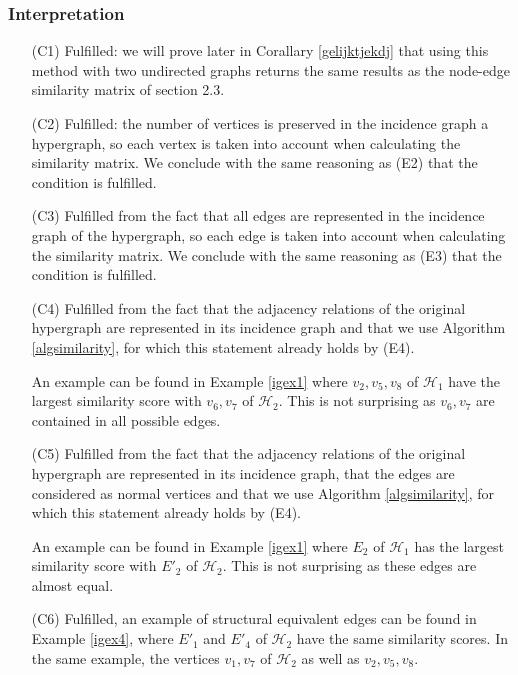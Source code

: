 \documentclass[a4paper,11pt]{report}
\newcommand{\hgrafeen}{\mathcal{H}}
\begin{document}
\subsubsection{Interpretation}

\begin{itemize}
  \item[(C1)] Fulfilled: we will prove later in Corallary \ref{gelijktjekdj} 
  that using this method with two undirected graphs returns the same results as 
  the node-edge similarity matrix of section 2.3.
      \item[(C2)] Fulfilled: the number of vertices is preserved in the incidence graph a hypergraph, so each vertex is taken into account when calculating the similarity matrix. We conclude with the same reasoning as (E2) that the condition is fulfilled.
    \item[(C3)] Fulfilled from the fact that all edges are 
    represented in the incidence graph of the hypergraph, so each edge is taken into account when calculating the similarity matrix. We conclude with the same reasoning as (E3) that the condition is fulfilled.

  \item[(C4)] Fulfilled from the fact that the adjacency relations of the original hypergraph are represented in its 
  incidence graph and that we use Algorithm \ref{algsimilarity}, for which this 
  statement already holds by (E4).
  
  An example can be found in Example \ref{igex1} where $v_2, v_5, v_8$ of $\hgrafeen_1$ 
  have the largest similarity score with $v_6, v_7$ of $\hgrafeen_2$. This is 
  not surprising as $v_6, v_7$ are contained in all possible edges.
  \item[(C5)] Fulfilled from the fact that the adjacency relations of the original hypergraph are represented in its 
  incidence graph, that the edges are considered as normal vertices and that we use Algorithm \ref{algsimilarity}, for which this 
  statement already holds by (E4).
  
  
  An example can be found in Example \ref{igex1} where $E_2$ of $\hgrafeen_1$ 
  has the largest similarity score with $E'_2$ of $\hgrafeen_2$. This is 
  not surprising as these edges are almost equal.


  \item[(C6)] Fulfilled, an example of structural equivalent edges can be found in Example \ref{igex4}, where 
  $E'_1$ and $E'_4$ of $\hgrafeen_2$ have the same similarity scores. In the same 
  example, the vertices $v_1, v_7$ of $\hgrafeen_2$ as well as $v_2, v_5, v_8$.


\end{itemize}
\end{document}
